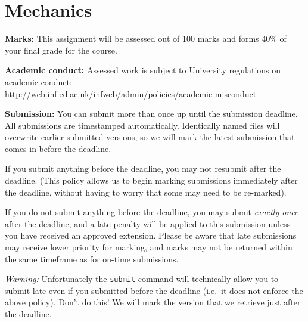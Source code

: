 \documentclass[11pt,]{article}
\def\markweight{40\xspace}
\begin{document}




\section{Mechanics}
\label{sec:mechanics}

\textbf{Marks:} 
This assignment will be assessed out of 100 marks and forms \markweight\% of your final grade for the course.

\textbf{Academic conduct:} 
Assessed work is subject to University
regulations on academic
conduct:\\ {\small \url{http://web.inf.ed.ac.uk/infweb/admin/policies/academic-misconduct}}

\textbf{Submission:} 
You can submit more than once up until the submission deadline. All
submissions are timestamped automatically. Identically named files
will overwrite earlier submitted versions, so we will mark the latest
submission that comes in before the deadline.

If you submit anything before the deadline, you may not resubmit
after the deadline. (This policy allows us to begin marking submissions
immediately after the deadline, without having to worry that some may
need to be re-marked).

If you do not submit anything before the deadline, you may submit {\em
exactly once} after the deadline, and a late penalty will be applied
to this submission unless you have received an approved extension.
Please be aware that late submissions may receive lower priority for
marking, and marks may not be returned within the same timeframe as
for on-time submissions.

{\em Warning:} Unfortunately the \verb+submit+ command will technically
allow you to submit late even if you submitted before the deadline
(i.e.\ it does not enforce the above policy). Don't do this! We will
mark the version that we retrieve just after the deadline.
\end{document}
